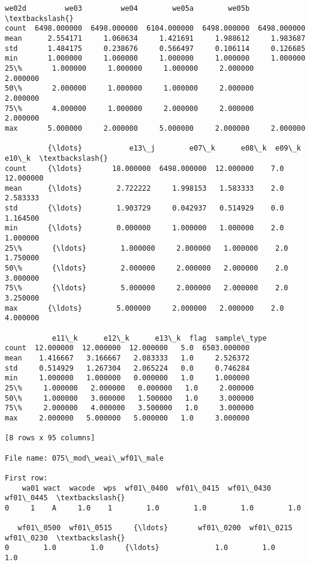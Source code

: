 \documentclass[11pt]{article}
\begin{document}
\begin{Verbatim}[commandchars=\\\{\}]
             we02d         we03         we04        we05a        we05b  \textbackslash{}
count  6498.000000  6498.000000  6104.000000  6498.000000  6498.000000   
mean      2.554171     1.060634     1.421691     1.988612     1.983687   
std       1.484175     0.238676     0.566497     0.106114     0.126685   
min       1.000000     1.000000     1.000000     1.000000     1.000000   
25\%       1.000000     1.000000     1.000000     2.000000     2.000000   
50\%       2.000000     1.000000     1.000000     2.000000     2.000000   
75\%       4.000000     1.000000     2.000000     2.000000     2.000000   
max       5.000000     2.000000     5.000000     2.000000     2.000000   

          {\ldots}           e13\_j        e07\_k      e08\_k  e09\_k      e10\_k  \textbackslash{}
count     {\ldots}       18.000000  6498.000000  12.000000    7.0  12.000000   
mean      {\ldots}        2.722222     1.998153   1.583333    2.0   2.583333   
std       {\ldots}        1.903729     0.042937   0.514929    0.0   1.164500   
min       {\ldots}        0.000000     1.000000   1.000000    2.0   1.000000   
25\%       {\ldots}        1.000000     2.000000   1.000000    2.0   1.750000   
50\%       {\ldots}        2.000000     2.000000   2.000000    2.0   3.000000   
75\%       {\ldots}        5.000000     2.000000   2.000000    2.0   3.250000   
max       {\ldots}        5.000000     2.000000   2.000000    2.0   4.000000   

           e11\_k      e12\_k      e13\_k  flag  sample\_type  
count  12.000000  12.000000  12.000000   5.0  6503.000000  
mean    1.416667   3.166667   2.083333   1.0     2.526372  
std     0.514929   1.267304   2.065224   0.0     0.746284  
min     1.000000   1.000000   0.000000   1.0     1.000000  
25\%     1.000000   2.000000   0.000000   1.0     2.000000  
50\%     1.000000   3.000000   1.500000   1.0     3.000000  
75\%     2.000000   4.000000   3.500000   1.0     3.000000  
max     2.000000   5.000000   5.000000   1.0     3.000000  

[8 rows x 95 columns]

File name: 075\_mod\_weai\_wf01\_male

First row: 
    wa01 wact  wacode  wps  wf01\_0400  wf01\_0415  wf01\_0430  wf01\_0445  \textbackslash{}
0     1    A     1.0    1        1.0        1.0        1.0        1.0   

   wf01\_0500  wf01\_0515     {\ldots}       wf01\_0200  wf01\_0215  wf01\_0230  \textbackslash{}
0        1.0        1.0     {\ldots}             1.0        1.0        1.0   


\end{Verbatim}
\end{document}
